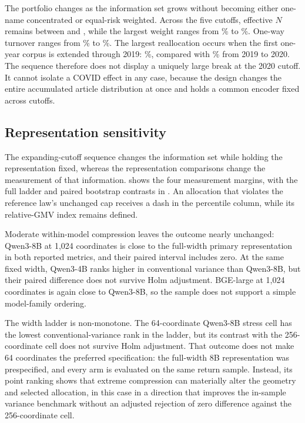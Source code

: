 The portfolio changes as the information set grows without becoming either
one-name concentrated or equal-risk weighted.
Across the five cutoffs, effective $N$ remains between
 and
, while the largest weight ranges
from \% to
\%.
One-way turnover ranges from \% to
\%.
The largest reallocation occurs when the first one-year corpus is extended
through 2019:
\%, compared with
\% from 2019 to 2020.
The sequence therefore does not display a uniquely large break at the 2020
cutoff.
It cannot isolate a COVID effect in any case, because the design changes the
entire accumulated article distribution at once and holds a common encoder
fixed across cutoffs.

\subsection{Representation sensitivity}
\label{sec:p3-representation-results}

The expanding-cutoff sequence changes the information set while holding the
representation fixed, whereas the representation comparisons change the
measurement of that information.
 shows the four measurement margins, with the
full ladder and paired bootstrap contrasts in
.
An allocation that violates the reference law's unchanged cap receives a dash
in the percentile column, while its relative-GMV index remains defined.



Moderate within-model compression leaves the outcome nearly unchanged:
Qwen3-8B at 1,024 coordinates is close to the full-width primary representation
in both reported metrics, and their paired interval includes zero.
At the same fixed width, Qwen3-4B ranks higher in conventional variance than
Qwen3-8B, but their paired difference does not survive Holm adjustment.
BGE-large at 1,024 coordinates is again close to Qwen3-8B, so the sample does
not support a simple model-family ordering.

The width ladder is non-monotone.
The 64-coordinate Qwen3-8B stress cell has the lowest conventional-variance
rank in the ladder, but its contrast with the 256-coordinate cell does not
survive Holm adjustment.
That outcome does not make 64 coordinates the preferred specification: the
full-width 8B representation was prespecified, and every arm is evaluated on
the same return sample.
Instead, its point ranking shows that extreme compression can materially alter
the geometry and selected allocation, in this case in a direction that
improves the in-sample variance benchmark without an adjusted rejection of
zero difference against the 256-coordinate cell.

